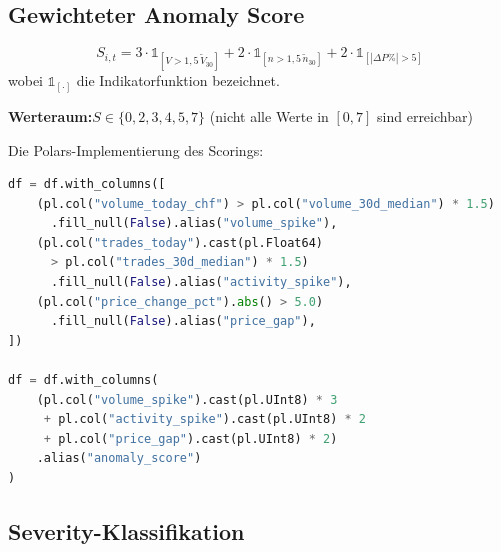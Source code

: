 \documentclass[11pt, a4paper, oneside, openany]{report}
\newcommand{\code}[1]{\texttt{\small\textcolor{DeepNavy}{#1}}}
\begin{document}
\subsection{Gewichteter Anomaly Score}

\begin{mathbox}
\[
  \boxed{\;S_{i,t} = 3 \cdot \mathbb{1}_{\left[V > 1{,}5\,\tilde{V}_{30}\right]} + 2 \cdot \mathbb{1}_{\left[n > 1{,}5\,\tilde{n}_{30}\right]} + 2 \cdot \mathbb{1}_{\left[|\Delta P\%| > 5\right]}\;}
\]
wobei $\mathbb{1}_{[\cdot]}$ die Indikatorfunktion bezeichnet.

\textbf{Werteraum:}\;$S \in \{0, 2, 3, 4, 5, 7\}$ (nicht alle Werte in $[0,7]$ sind erreichbar)
\end{mathbox}

\noindent Die Polars-Implementierung des Scorings:

\begin{lstlisting}[language=Python, caption={Anomalie-Scoring in Polars (\code{metrics.py})}]
df = df.with_columns([
    (pl.col("volume_today_chf") > pl.col("volume_30d_median") * 1.5)
      .fill_null(False).alias("volume_spike"),
    (pl.col("trades_today").cast(pl.Float64)
      > pl.col("trades_30d_median") * 1.5)
      .fill_null(False).alias("activity_spike"),
    (pl.col("price_change_pct").abs() > 5.0)
      .fill_null(False).alias("price_gap"),
])

df = df.with_columns(
    (pl.col("volume_spike").cast(pl.UInt8) * 3
     + pl.col("activity_spike").cast(pl.UInt8) * 2
     + pl.col("price_gap").cast(pl.UInt8) * 2)
    .alias("anomaly_score")
)
\end{lstlisting}

\subsection{Severity-Klassifikation}
\end{document}
